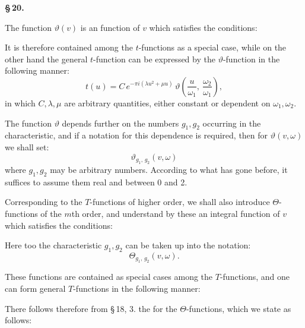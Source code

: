 
\begin{center}
\textbf{\S\,20. }
\end{center}

The function $\vartheta(v)$ is an  function of $v$ which
satisfies the conditions:


It is therefore contained among the $t$-functions as a special
case, while on the other hand the general $t$-function can be
expressed by the $\vartheta$-function in the following manner:
\[
t(u) = C\, e^{-\pi i(\lambda u^2 + \mu u)}\, \vartheta\!\left(\frac{u}{\omega_1},\ \frac{\omega_2}{\omega_1}\right),
\]
in which $C, \lambda, \mu$ are arbitrary quantities, either constant or
dependent on $\omega_1, \omega_2$.

The function $\vartheta$ depends further on the numbers $g_1, g_2$
occurring in the characteristic, and if a notation for
this dependence is required, then for $\vartheta(v, \omega)$ we shall set:
\[
\vartheta_{g_1,\, g_2}(v, \omega)
\]
where $g_1, g_2$ may be arbitrary numbers.
According to what has gone before, it suffices to assume them real and between 0
and 2.

Corresponding to the $T$-functions of higher order, we shall
also introduce $\Theta$-functions of the $m$th order, and understand
by these an integral function of $v$ which satisfies the conditions:


Here too the characteristic $g_1, g_2$ can be taken up into the
notation:
\[
\Theta_{g_1,\, g_2}(v, \omega).
\]

These functions are contained as special cases among the $T$-functions,
and one can form general $T$-functions in the
following manner:


There follows therefore from \S\,18, 3. the  for
the $\Theta$-functions, which we state as follows:
